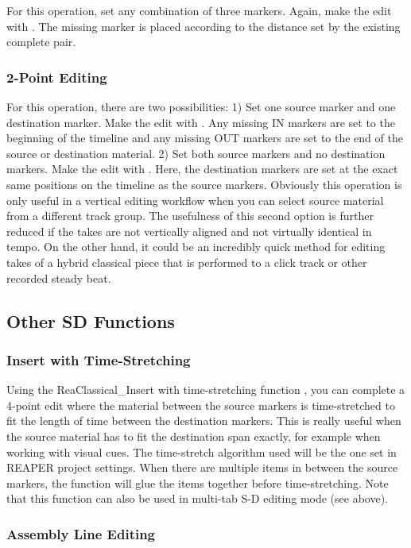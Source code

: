 \documentclass[10pt,american]{article}
\begin{document}
For this operation, set any combination of three markers. Again, make the edit
with  . The missing marker is placed according to the distance set by
the existing complete pair. 

\subsubsection{2-Point Editing}

For this operation, there are two possibilities: 1) Set one source marker and
one destination marker. Make the edit with  . Any missing IN markers are
set to the beginning of the timeline and any missing OUT markers are set to the
end of the source or destination material. 2) Set both source markers and no
destination markers. Make the edit with  . Here, the destination markers
are set at the exact same positions on the timeline as the source markers.
Obviously this operation is only useful in a vertical editing workflow when you
can select source material from a different track group. The usefulness of this
second option is further reduced if the takes are not vertically aligned and not
virtually identical in tempo. On the other hand, it could be an incredibly quick
method for editing takes of a hybrid classical piece that is performed to a
click track or other recorded steady beat.

\subsection{Other SD Functions}

\subsubsection{Insert with Time-Stretching}

Using the ReaClassical\_Insert with time-stretching function  , you can
complete a 4-point edit where the material between the source markers is
time-stretched to fit the length of time between the destination markers. This
is really useful when the source material has to fit the destination span
exactly, for example when working with visual cues. The time-stretch algorithm
used will be the one set in REAPER project settings. When there are multiple
items in between the source markers, the function will glue the items together
before time-stretching. Note that this function can also be used in multi-tab
S-D editing mode (see above).

\subsubsection{Assembly Line Editing}
\end{document}
